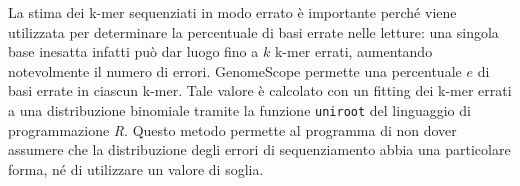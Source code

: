 \documentclass[crop=false, class=book]{standalone}
\begin{document}
	La stima dei k-mer sequenziati in modo errato è importante perché viene utilizzata per determinare la percentuale di basi errate nelle letture: una singola base inesatta infatti può dar luogo fino a $k$ k-mer errati, aumentando notevolmente il numero di errori. GenomeScope permette una percentuale $e$ di basi errate in ciascun k-mer. Tale valore è calcolato con un fitting dei k-mer errati a una distribuzione binomiale tramite la funzione \verb|uniroot| del linguaggio di programmazione \textit{R}. Questo metodo permette al programma di non dover assumere che la distribuzione degli errori di sequenziamento abbia una particolare forma, né di utilizzare un valore di soglia.
	
\end{document}
